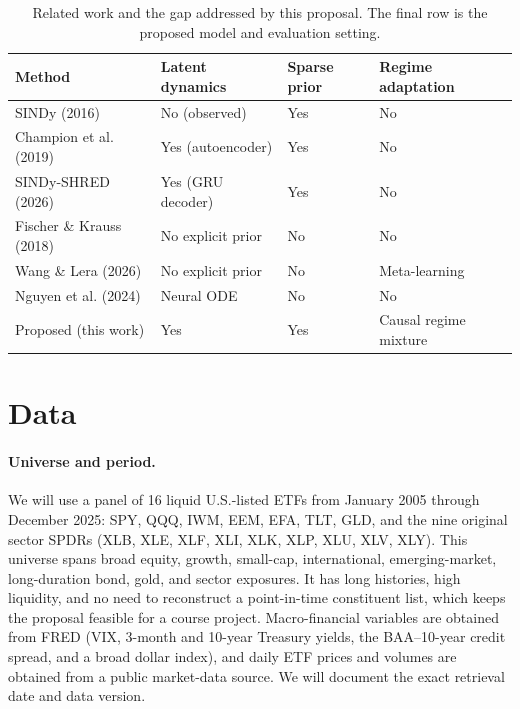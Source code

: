 \documentclass{article}
\begin{document}
\begin{table}[t]
  \caption{Related work and the gap addressed by this proposal. The final row is the proposed model and evaluation setting.}
  \label{tab:related}
  \centering
  \small
  \begin{tabular}{@{}p{3.4cm}p{2.6cm}p{1.6cm}p{3.0cm}@{}}
    \toprule
    Method & Latent dynamics & Sparse prior & Regime adaptation \\
    \midrule
    SINDy (2016) & No (observed) & Yes & No \\
    Champion et al. (2019) & Yes (autoencoder) & Yes & No \\
    SINDy-SHRED (2026) & Yes (GRU decoder) & Yes & No \\
    Fischer \& Krauss (2018) & No explicit prior & No & No \\
    Wang \& Lera (2026) & No explicit prior & No & Meta-learning \\
    Nguyen et al. (2024) & Neural ODE & No & No \\
    \midrule
    Proposed (this work) & Yes & Yes & Causal regime mixture \\
    \bottomrule
  \end{tabular}
\end{table}

\section{Data}

\paragraph{Universe and period.}
We will use a panel of 16 liquid U.S.-listed ETFs from January 2005 through December 2025: SPY, QQQ, IWM, EEM, EFA, TLT, GLD, and the nine original sector SPDRs (XLB, XLE, XLF, XLI, XLK, XLP, XLU, XLV, XLY). This universe spans broad equity, growth, small-cap, international, emerging-market, long-duration bond, gold, and sector exposures. It has long histories, high liquidity, and no need to reconstruct a point-in-time constituent list, which keeps the proposal feasible for a course project. Macro-financial variables are obtained from FRED (VIX, 3-month and 10-year Treasury yields, the BAA--10-year credit spread, and a broad dollar index), and daily ETF prices and volumes are obtained from a public market-data source. We will document the exact retrieval date and data version.
\end{document}
